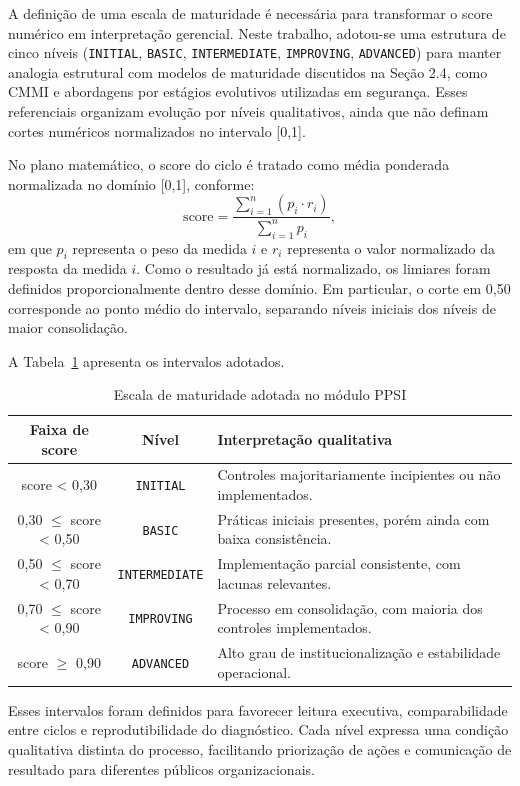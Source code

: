 \documentclass[12pt]{article}
\begin{document}
A definição de uma escala de maturidade é necessária para transformar o score numérico em interpretação gerencial. Neste trabalho, adotou-se uma estrutura de cinco níveis (\texttt{INITIAL}, \texttt{BASIC}, \texttt{INTERMEDIATE}, \texttt{IMPROVING}, \texttt{ADVANCED}) para manter analogia estrutural com modelos de maturidade discutidos na Seção 2.4, como CMMI e abordagens por estágios evolutivos utilizadas em segurança. Esses referenciais organizam evolução por níveis qualitativos, ainda que não definam cortes numéricos normalizados no intervalo [0,1].

No plano matemático, o score do ciclo é tratado como média ponderada normalizada no domínio [0,1], conforme:
\[
\text{score}=\frac{\sum_{i=1}^{n}(p_i \cdot r_i)}{\sum_{i=1}^{n}p_i},
\]
em que \(p_i\) representa o peso da medida \(i\) e \(r_i\) representa o valor normalizado da resposta da medida \(i\). Como o resultado já está normalizado, os limiares foram definidos proporcionalmente dentro desse domínio. Em particular, o corte em 0,50 corresponde ao ponto médio do intervalo, separando níveis iniciais dos níveis de maior consolidação.

A Tabela~\ref{tab:escala-maturidade} apresenta os intervalos adotados.

\begin{table}[htb]
\centering
\caption{Escala de maturidade adotada no módulo PPSI}
\label{tab:escala-maturidade}
\begin{tabular}{|c|c|p{6.2cm}|}
\hline
\textbf{Faixa de score} & \textbf{Nível} & \textbf{Interpretação qualitativa} \\
\hline
score < 0,30 & \texttt{INITIAL} & Controles majoritariamente incipientes ou não implementados. \\
\hline
0,30 \(\le\) score < 0,50 & \texttt{BASIC} & Práticas iniciais presentes, porém ainda com baixa consistência. \\
\hline
0,50 \(\le\) score < 0,70 & \texttt{INTERMEDIATE} & Implementação parcial consistente, com lacunas relevantes. \\
\hline
0,70 \(\le\) score < 0,90 & \texttt{IMPROVING} & Processo em consolidação, com maioria dos controles implementados. \\
\hline
score \(\ge\) 0,90 & \texttt{ADVANCED} & Alto grau de institucionalização e estabilidade operacional. \\
\hline
\end{tabular}
\end{table}

Esses intervalos foram definidos para favorecer leitura executiva, comparabilidade entre ciclos e reprodutibilidade do diagnóstico. Cada nível expressa uma condição qualitativa distinta do processo, facilitando priorização de ações e comunicação de resultado para diferentes públicos organizacionais.
\end{document}
